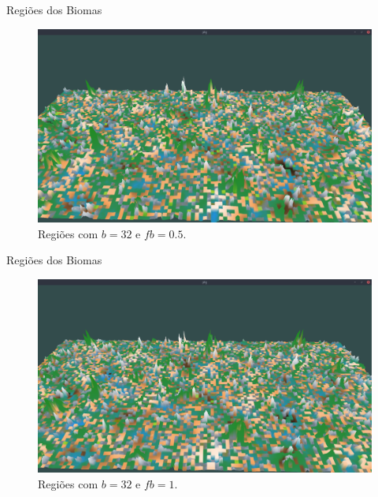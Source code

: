 \begin{frame}{Regiões dos Biomas}
    \begin{figure}[H]
        \centering
        \includegraphics[width=.9\textwidth]{img/re2bfb/fb/05b32.png}
        \caption{Regiões com $b = 32$ e $fb = 0.5$.}
        \label{fig:img_re2bfb_fb_05b32}
    \end{figure}
    
    
\end{frame}

\begin{frame}{Regiões dos Biomas}
    \begin{figure}[H]
        \centering
        \includegraphics[width=.9\textwidth]{img/re2bfb/fb/1b32.png}
        \caption{Regiões com $b = 32$ e $fb = 1$.}
        \label{fig:img_re2bfb_fb_1b32}
    \end{figure}
    
    
\end{frame}

